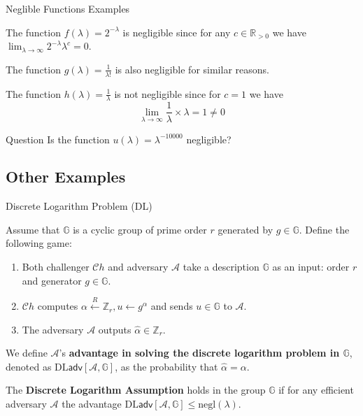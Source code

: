 \documentclass{beamer}
\begin{document}
    \begin{frame}{Neglible Functions Examples}
        \begin{example}
            The function $f(\lambda) = 2^{-\lambda}$ is negligible since for any $c \in \mathbb{R}_{>0}$ we have $\lim_{\lambda \to \infty} 2^{-\lambda}\lambda^c = 0$.
        
            The function $g(\lambda) = \frac{1}{\lambda!}$ is also negligible for similar reasons.
        \end{example}
        
        \begin{example}
            The function $h(\lambda) = \frac{1}{\lambda}$ is not negligible since for $c = 1$ we have
            \begin{equation*}
                \lim_{\lambda \to \infty} \frac{1}{\lambda} \times \lambda = 1 \neq 0
            \end{equation*}
        \end{example}

        \begin{alertblock}{Question}
            Is the function $u(\lambda) = \lambda^{-10000}$ negligible?
        \end{alertblock}
    \end{frame}

    \subsection{Other Examples}
    \begin{frame}{Discrete Logarithm Problem (DL)}
        \begin{definition}
            Assume that $\mathbb{G}$ is a cyclic group of prime order $r$ generated by $g \in \mathbb{G}$. Define the following game:
            \begin{enumerate}
                \item Both challenger $\mathcal{C}h$ and adversary $\mathcal{A}$ take a description $\mathbb{G}$ as an input: order $r$ and generator $g \in \mathbb{G}$.
                \item $\mathcal{C}h$ computes $\alpha \xleftarrow{R} \mathbb{Z}_r, u \gets g^{\alpha}$ and sends $u \in \mathbb{G}$ to $\mathcal{A}$.
                \item The adversary $\mathcal{A}$ outputs $\hat{\alpha} \in \mathbb{Z}_r$.
            \end{enumerate}
        
            We define $\mathcal{A}$'s \textbf{advantage in solving the discrete logarithm problem in $\mathbb{G}$}, denoted as $\text{DL}\mathsf{adv}[\mathcal{A},\mathbb{G}]$, as the probability that $\hat{\alpha} = \alpha$.
        \end{definition}
        
        \begin{definition}
            The \textbf{Discrete Logarithm Assumption} holds in the group $\mathbb{G}$ if for any efficient adversary $\mathcal{A}$ the advantage $\text{DL}\mathsf{adv}[\mathcal{A},\mathbb{G}] \leq \text{negl}(\lambda)$.
        \end{definition}
    \end{frame}
\end{document}
